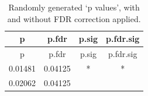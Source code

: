 \documentclass[]{article}
\theoremstyle{definition}
\theoremstyle{definition}
\theoremstyle{definition}
\theoremstyle{remark}
\begin{document}
\begin{longtable}[]{@{}cccc@{}}
\caption{Randomly generated `p values', with and without FDR correction
applied.}\tabularnewline
\toprule
\begin{minipage}[b]{0.12\columnwidth}\centering\strut
p\strut
\end{minipage} & \begin{minipage}[b]{0.12\columnwidth}\centering\strut
p.fdr\strut
\end{minipage} & \begin{minipage}[b]{0.10\columnwidth}\centering\strut
p.sig\strut
\end{minipage} & \begin{minipage}[b]{0.14\columnwidth}\centering\strut
p.fdr.sig\strut
\end{minipage}\tabularnewline
\midrule
\endfirsthead
\toprule
\begin{minipage}[b]{0.12\columnwidth}\centering\strut
p\strut
\end{minipage} & \begin{minipage}[b]{0.12\columnwidth}\centering\strut
p.fdr\strut
\end{minipage} & \begin{minipage}[b]{0.10\columnwidth}\centering\strut
p.sig\strut
\end{minipage} & \begin{minipage}[b]{0.14\columnwidth}\centering\strut
p.fdr.sig\strut
\end{minipage}\tabularnewline
\midrule
\endhead
\begin{minipage}[t]{0.12\columnwidth}\centering\strut
0.01481\strut
\end{minipage} & \begin{minipage}[t]{0.12\columnwidth}\centering\strut
0.04125\strut
\end{minipage} & \begin{minipage}[t]{0.10\columnwidth}\centering\strut
*\strut
\end{minipage} & \begin{minipage}[t]{0.14\columnwidth}\centering\strut
*\strut
\end{minipage}\tabularnewline
\begin{minipage}[t]{0.12\columnwidth}\centering\strut
0.02062\strut
\end{minipage} & \begin{minipage}[t]{0.12\columnwidth}\centering\strut
0.04125\strut
\end{minipage} & \begin{minipage}[t]{0.10\columnwidth}\centering\strut

\end{minipage}
\end{longtable}
\end{document}
